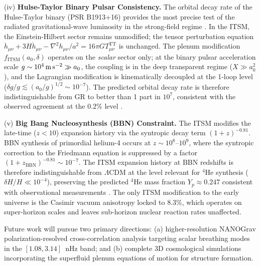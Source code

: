 \documentclass[aps,prd,10pt,twocolumn,superscriptaddress,nofootinbib,floatfix]{revtex4-2}
\begin{document}
(iv) \textbf{Hulse-Taylor Binary Pulsar Consistency.} The orbital decay rate of the Hulse-Taylor binary (PSR B1913+16) provides the most precise test of the radiated gravitational-wave luminosity in the strong-field regime \cite{weisberg_taylor}. In the ITSM, the Einstein-Hilbert sector remains unmodified; the tensor perturbation equation $\ddot{h}_{\mu\nu} + 3H\dot{h}_{\mu\nu} - \nabla^2 h_{\mu\nu}/a^2 = 16\pi G T_{\mu\nu}^{\text{TT}}$ is unchanged. The plenum modification $f_{\text{ITSM}}(a_0, \delta)$ operates on the \emph{scalar} sector only; at the binary pulsar acceleration scale $g \sim 10^{4}\,\text{m\,s}^{-2} \gg a_0$, the coupling is in the deep transparent regime ($X \gg a_0^2$), and the Lagrangian modification is kinematically decoupled at the 1-loop level ($\delta g / g \lesssim (a_0/g)^{1/2} \sim 10^{-7}$). The predicted orbital decay rate is therefore indistinguishable from GR to better than 1 part in $10^7$, consistent with the observed agreement at the $0.2\%$ level \cite{weisberg_taylor}.

(v) \textbf{Big Bang Nucleosynthesis (BBN) Constraint.} The ITSM modifies the late-time ($z < 10$) expansion history via the syntropic decay term $(1+z)^{-0.81}$. BBN synthesis of primordial helium-4 occurs at $z \sim 10^8$--$10^9$, where the syntropic correction to the Friedmann equation is suppressed by a factor $(1+z_\text{BBN})^{-0.81} \sim 10^{-7}$. The ITSM expansion history at BBN redshifts is therefore indistinguishable from $\Lambda$CDM at the level relevant for $^4$He synthesis ($\delta H / H \ll 10^{-4}$), preserving the predicted $^4$He mass fraction $Y_p \approx 0.247$ consistent with observational measurements \cite{planck}. The only ITSM modification to the early universe is the Casimir vacuum anisotropy locked to $8.3\%$, which operates on super-horizon scales and leaves sub-horizon nuclear reaction rates unaffected.

Future work will pursue two primary directions: (a) higher-resolution NANOGrav polarization-resolved cross-correlation analysis targeting scalar breathing modes in the $[1.08, 3.14]$~nHz band; and (b) complete 3D cosmological simulations incorporating the superfluid plenum equations of motion for structure formation.
\end{document}
